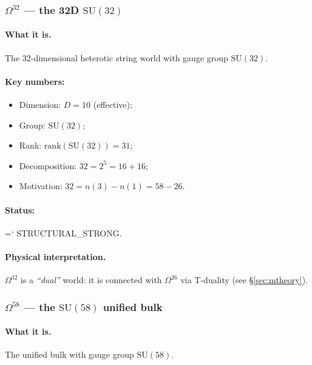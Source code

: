 \documentclass[11pt,a4paper]{article}
\newcommand{\SU}{\mathrm{SU}}
\newcommand{\Omtw}{\Omega^{26}}
\newcommand{\Omth}{\Omega^{32}}
\newcommand{\Omfi}{\Omega^{58}}
\renewcommand{\texttt}[1]{{\ttfamily\hyphenchar\font=`\- #1}}
\theoremstyle{definition}
\begin{document}
\subsubsection{$\Omth$ — the 32D $\SU(32)$}

\paragraph{What it is.}
The 32-dimensional heterotic string world with gauge group 
$\SU(32)$.

\paragraph{Key numbers:}
\begin{itemize}
    \item Dimension: $D = 10$ (effective);
    \item Group: $\SU(32)$;
    \item Rank: $\mathrm{rank}(\SU(32)) = 31$;
    \item Decomposition: $32 = 2^5 = 16 + 16$;
    \item Motivation: $32 = n(3) - n(1) = 58 - 26$.
\end{itemize}

\paragraph{Status:} \texttt{STRUCTURAL\_STRONG}.

\paragraph{Physical interpretation.}
$\Omth$ is a \emph{``dual''} world: it is connected with $\Omtw$ via 
T-duality (see §\ref{sec:mtheory}).

\subsubsection{$\Omfi$ — the $\SU(58)$ unified bulk}

\paragraph{What it is.}
The unified bulk with gauge group $\SU(58)$.
\end{document}
